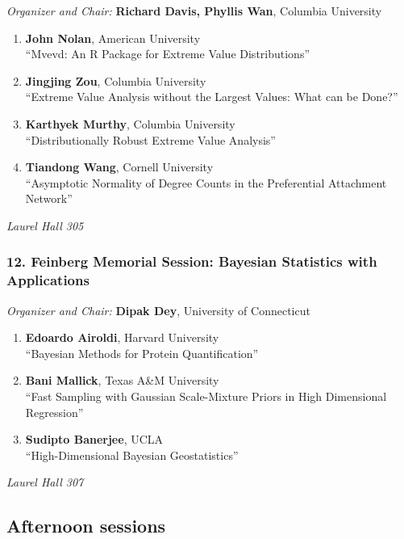 \emph{Organizer and Chair:} \textbf{Richard Davis, Phyllis Wan}, Columbia University

\begin{enumerate}
\item \textbf{John Nolan}, American University \\
``Mvevd: An R Package for Extreme Value Distributions''
\item \textbf{Jingjing Zou}, Columbia University \\
``Extreme Value Analysis without the Largest Values: What can be Done?''
\item \textbf{Karthyek Murthy}, Columbia University \\
``Distributionally Robust Extreme Value Analysis''
\item \textbf{Tiandong Wang}, Cornell University \\
``Asymptotic Normality of Degree Counts in the Preferential Attachment Network''
\end{enumerate}

\emph{Laurel Hall 305} \\[.5em]

\subsubsection*{12. Feinberg Memorial Session: Bayesian Statistics with Applications}

\emph{Organizer and Chair:} \textbf{Dipak Dey}, University of Connecticut

\begin{enumerate}
\item \textbf{Edoardo Airoldi}, Harvard University \\
``Bayesian Methods for Protein Quantification''
\item \textbf{Bani Mallick}, Texas A\&M University \\
``Fast Sampling with Gaussian Scale-Mixture Priors in High Dimensional Regression''
\item \textbf{Sudipto Banerjee}, UCLA \\
``High-Dimensional Bayesian Geostatistics''
\end{enumerate}

\emph{Laurel Hall 307} \\[.5em]

\subsection*{Afternoon sessions}

